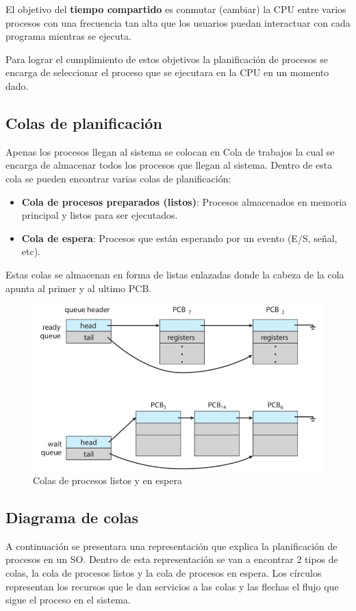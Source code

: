 \documentclass{templateNote}
\begin{document}
El objetivo del \textbf{tiempo compartido} es conmutar (cambiar) la CPU entre varios procesos con una frecuencia tan alta que los usuarios puedan interactuar con cada programa mientras se ejecuta.

Para lograr el cumplimiento de estos objetivos la planificación de procesos se encarga de seleccionar el proceso que se ejecutara en la CPU en un momento dado.

\subsection*{Colas de planificación}
Apenas los procesos llegan al sistema se colocan en Cola de trabajos la cual se encarga de almacenar todos los procesos que llegan al sistema. Dentro de esta cola se pueden encontrar varias colas de planificación:
\begin{itemize}
    \item \textbf{Cola de procesos preparados (listos)}: Procesos almacenados en memoria principal y listos para ser ejecutados.
    \item \textbf{Cola de espera}: Procesos que están esperando por un evento (E/S, señal, etc).    
\end{itemize}

Estas colas se almacenan en forma de listas enlazadas donde la cabeza de la cola apunta al primer y al ultimo PCB. 

\begin{figure}[H]
    \centering
    \includegraphics[width=\textwidth]{img/colas.png}
    \caption{Colas de procesos listos y en espera}
\end{figure}

\subsection*{Diagrama de colas}
A continuación se presentara una representación que explica la planificación de procesos en un SO. Dentro de esta representación se van a encontrar 2 tipos de colas, la cola de procesos listos y la cola de procesos en espera.
Los círculos representan los recursos que le dan servicios a las colas y las flechas el flujo que sigue el proceso en el sistema.
\end{document}
